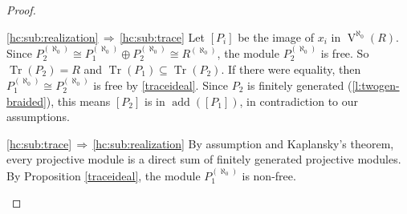 \documentclass[a4paper,11pt,oneside]{amsart}
\theoremstyle{remark}
\DeclareMathOperator{\add}{add}
\DeclareMathOperator{\Tr}{Tr}
\DeclareMathOperator{\Vmon}{V}
\begin{document}
\begin{proof}
\begin{proofenumerate}
  \ref{hc:sub:realization}$\,\Rightarrow\,$\ref{hc:sub:trace}
  Let $[P_i]$ be the image of $x_i$ in $\Vmon^{\aleph_0}(R)$.
  Since $P_2^{(\aleph_0)} \cong P_1^{(\aleph_0)} \oplus P_2^{(\aleph_0)} \cong R^{(\aleph_0)}$, the module $P_2^{(\aleph_0)}$ is free.
  So $\Tr(P_2) = R$ and $\Tr(P_1) \subseteq \Tr(P_2)$.
  If there were equality, then $P_1^{(\aleph_0)} \cong P_2^{(\aleph_0)}$ is free by \cref{traceideal}.
  Since $P_2$ is finitely generated (\cref{l:twogen-braided}), this means $[P_2]$ is in $\add([P_1])$, in contradiction to our assumptions. 

  \ref{hc:sub:trace}$\,\Rightarrow\,$\ref{hc:sub:realization}
  By assumption and Kaplansky's theorem, every projective module is a direct sum of finitely generated projective modules.
  By Proposition \ref{traceideal}, the module $P_1^{(\aleph_0)}$ is non-free.\qedhere
  \end{proofenumerate}
\end{proof}




\end{document}
